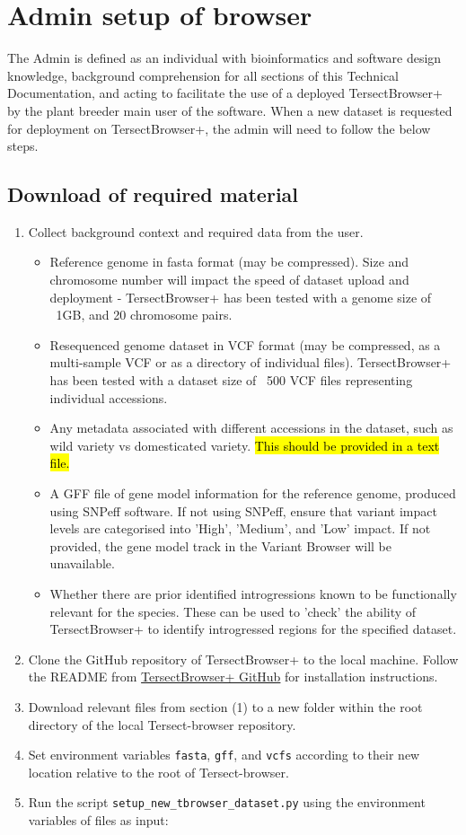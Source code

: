 \documentclass[12pt]{article}
\begin{document}
\section{Admin setup of browser}
The Admin is defined as an individual with bioinformatics and software design knowledge, background comprehension for all sections of this Technical Documentation, and acting to facilitate the use of a deployed TersectBrowser+ by the plant breeder main user of the software. When a new dataset is requested for deployment on TersectBrowser+, the admin will need to follow the below steps.

\subsection{Download of required material}
\begin{enumerate}
  \item Collect background context and required data from the user.
\begin{itemize}
  \item Reference genome in fasta format (may be compressed). Size and chromosome number will impact the speed of dataset upload and deployment - TersectBrowser+ has been tested with a genome size of ~1GB, and 20 chromosome pairs.
  \item Resequenced genome dataset in VCF format (may be compressed, as a multi-sample VCF or as a directory of individual files). TersectBrowser+ has been tested with a dataset size of ~500 VCF files representing individual accessions. 
  \item Any metadata associated with different accessions in the dataset, such as wild variety vs domesticated variety. \hl{This should be provided in a text file.}
  \item A GFF file of gene model information for the reference genome, produced using SNPeff software. If not using SNPeff, ensure that variant impact levels are categorised into 'High', 'Medium', and 'Low' impact. If not provided, the gene model track in the Variant Browser will be unavailable. 
  \item Whether there are prior identified introgressions known to be functionally relevant for the species. These can be used to 'check' the ability of TersectBrowser+ to identify introgressed regions for the specified dataset.
\end{itemize}
  \item Clone the GitHub repository of TersectBrowser+ to the local machine. Follow the README from \hyperlink {https://github.com/Tersect-Browser/Tersect-browser.git}{TersectBrowser+ GitHub} for installation instructions.
  \item Download relevant files from section (1) to a new folder within the root directory of the local Tersect-browser repository.
  \item Set environment variables \verb+fasta+, \verb+gff+, and \verb+vcfs+ according to their new location relative to the root of Tersect-browser.
  \item Run the script \verb+setup_new_tbrowser_dataset.py+ using the environment variables of files as input:
  

\end{enumerate}
\end{document}
